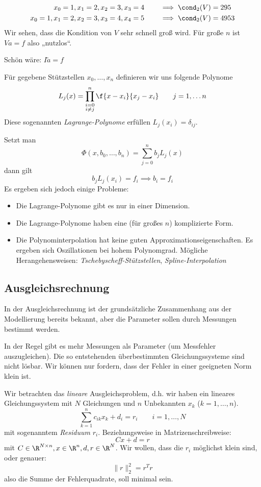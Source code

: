 \documentclass[a4paper]{scrartcl}
\numberwithin{equation}{section}
\begin{document}
\begin{ex*}
	\begin{align*}
		x_0=1, x_1= 2, x_2 = 3, x_3 = 4 \qquad &\implies \cond_2(V) = 295\\
		x_0=1, x_1= 2, x_2 = 3, x_3 = 4, x_4 = 5 \qquad &\implies \cond_2(V) = 4953
	\end{align*}
	Wir sehen, dass die Kondition von $V$ sehr schnell groß wird.
	Für große $n$ ist $Va=f$ also „nutzlos“.

	Schön wäre: $I\tilde a = f$
\end{ex*}

Für gegebene Stützstellen $x_0,\dotsc, x_n$ definieren wir uns folgende Polynome
\begin{align*}
	L_j(x) = \prod_{\substack{i=0\\i\neq j}}^n \f {x-x_i}{x_j-x_i} \qquad j=1,\dotsc n
\end{align*}
Diese sogenannten \emph{Lagrange-Polynome} erfüllen $L_j(x_i) = \delta_{ij}$.

Setzt man
\[
	\Phi(x, b_0,\dotsc, b_n) = \sum_{j=0}^n b_jL_j(x)
\]
dann gilt
\[
	b_jL_j(x_i) = f_i \implies b_i = f_i
\]
Es ergeben sich jedoch einige Probleme:
\begin{itemize}
	\item
		Die Lagrange-Polynome gibt es nur in einer Dimension.
	\item
		Die Lagrange-Polynome haben eine (für großes $n$) komplizierte Form.
	\item
		Die Polynominterpolation hat keine guten Approximationseigenschaften.
		Es ergeben sich Oszillationen bei hohem Polynomgrad.
		Mögliche Herangehensweisen:	\emph{Tschebyscheff-Stützstellen}, \emph{Spline-Interpolation}
\end{itemize}

\subsection{Ausgleichsrechnung}

In der Ausgleichsrechnung ist der grundsätzliche Zusammenhang aus der Modellierung bereits bekannt, aber die Parameter sollen durch Messungen bestimmt werden.

In der Regel gibt es mehr Messungen als Parameter (um Messfehler auszugleichen).
Die so entstehenden überbestimmten Gleichungssysteme sind nicht lösbar.
Wir können nur fordern, dass der Fehler in einer geeigneten Norm klein ist.

Wir betrachten das \emph{lineare} Ausgleichsproblem, d.h. wir haben ein lineares Gleichungssystem mit $N$ Gleichungen und $n$ Unbekannten $x_k$ ($k=1,\dotsc,n$).
\begin{equation}
	\label{eq:5.3}
	\sum_{k=1}^n c_{ik}x_k + d_i = r_i
	\qquad i=1,\dotsc, N
\end{equation}
mit sogenanntem \emph{Residuum} $r_i$.
Beziehungsweise in Matrizenschreibweise:
\[
	Cx + d = r
\]
mit $C\in \R^{N\times n}, x\in \R^n, d,r\in \R^N$.
Wir wollen, dass die $r_i$ möglichst klein sind, oder genauer:
\[
	\|r\|_2^2 = r^Tr
\]
also die Summe der Fehlerquadrate, soll minimal sein.
\end{document}
